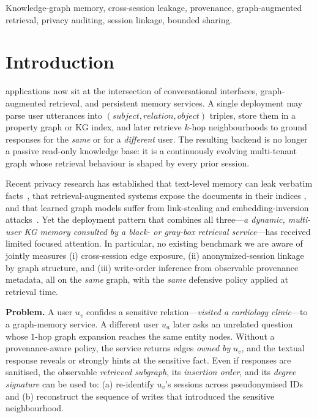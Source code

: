 \documentclass[journal,10pt,twocolumn]{IEEEtran}
\begin{document}
\begin{IEEEkeywords}
Knowledge-graph memory, cross-session leakage, provenance,
graph-augmented retrieval, privacy auditing, session linkage,
bounded sharing.
\end{IEEEkeywords}

\IEEEpeerreviewmaketitle

\section{Introduction}
 applications now sit at the intersection of
conversational interfaces, graph-augmented retrieval, and persistent
memory services. A single deployment may parse user utterances into
$(\textit{subject}, \textit{relation}, \textit{object})$ triples, store
them in a property graph or KG index, and later retrieve $k$-hop
neighbourhoods to ground responses for the \emph{same} or for a
\emph{different} user. The resulting backend is no longer a passive
read-only knowledge base: it is a continuously evolving multi-tenant
graph whose retrieval behaviour is shaped by every prior session.

Recent privacy research has established that text-level memory can
leak verbatim facts~\cite{Carlini2021,Mireshghallah2023}, that
retrieval-augmented systems expose the documents in their indices
\cite{Zeng2024,Qi2024RAG}, and that learned graph models
suffer from link-stealing and embedding-inversion
attacks~\cite{He2021Linkstealing,Wu2022GraphMI,Olatunji2023GraphPrivacy}.
Yet the deployment pattern that combines all three---\emph{a dynamic,
multi-user KG memory consulted by a black- or gray-box retrieval
service}---has received limited focused attention. In particular, no
existing benchmark we are aware of jointly measures (i) cross-session
edge exposure, (ii) anonymized-session linkage by graph structure, and
(iii) write-order inference from observable provenance metadata, all
on the \emph{same} graph, with the \emph{same} defensive policy
applied at retrieval time.

\noindent\textbf{Problem.} A user $u_v$ confides a sensitive
relation---\emph{visited a cardiology clinic}---to a graph-memory
service. A different user $u_a$ later asks an unrelated question whose
$1$-hop graph expansion reaches the same entity nodes. Without a
provenance-aware policy, the service returns edges \emph{owned by}
$u_v$, and the textual response reveals or strongly hints at the
sensitive fact. Even if responses are sanitised, the observable
\emph{retrieved subgraph}, its \emph{insertion order}, and its
\emph{degree signature} can be used to: (a) re-identify $u_v$'s
sessions across pseudonymised IDs and (b) reconstruct the sequence of
writes that introduced the sensitive neighbourhood.
\end{document}

